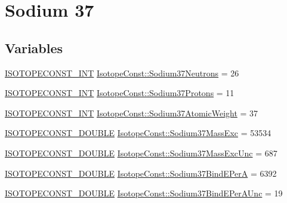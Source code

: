 \hypertarget{group___isotope_const-_sodium-_na37}{}\section{Sodium 37}
\label{group___isotope_const-_sodium-_na37}
\subsection*{Variables}
\begin{DoxyCompactItemize}
\item 
\mbox{\hyperlink{group___isotope_const-_macros_ga5f18360b3e99483a35c32d789e62621c}{I\+S\+O\+T\+O\+P\+E\+C\+O\+N\+S\+T\+\_\+\+I\+NT}} \mbox{\hyperlink{group___isotope_const-_sodium-_na37_ga4e99f0a91daca3e8f0f4841bedc4acd6}{Isotope\+Const\+::\+Sodium37\+Neutrons}} = 26
\item 
\mbox{\hyperlink{group___isotope_const-_macros_ga5f18360b3e99483a35c32d789e62621c}{I\+S\+O\+T\+O\+P\+E\+C\+O\+N\+S\+T\+\_\+\+I\+NT}} \mbox{\hyperlink{group___isotope_const-_sodium-_na37_ga2a98a7717f7478527d21cc03a9606cd2}{Isotope\+Const\+::\+Sodium37\+Protons}} = 11
\item 
\mbox{\hyperlink{group___isotope_const-_macros_ga5f18360b3e99483a35c32d789e62621c}{I\+S\+O\+T\+O\+P\+E\+C\+O\+N\+S\+T\+\_\+\+I\+NT}} \mbox{\hyperlink{group___isotope_const-_sodium-_na37_ga9a2eb9be0772b138d87dd13cd55b600a}{Isotope\+Const\+::\+Sodium37\+Atomic\+Weight}} = 37
\item 
\mbox{\hyperlink{group___isotope_const-_macros_ga8f45a7272ce02c0b4c65c44636ed719a}{I\+S\+O\+T\+O\+P\+E\+C\+O\+N\+S\+T\+\_\+\+D\+O\+U\+B\+LE}} \mbox{\hyperlink{group___isotope_const-_sodium-_na37_gaceaaf7e2fc609d8f1e7f5c461ec3d171}{Isotope\+Const\+::\+Sodium37\+Mass\+Exc}} = 53534
\item 
\mbox{\hyperlink{group___isotope_const-_macros_ga8f45a7272ce02c0b4c65c44636ed719a}{I\+S\+O\+T\+O\+P\+E\+C\+O\+N\+S\+T\+\_\+\+D\+O\+U\+B\+LE}} \mbox{\hyperlink{group___isotope_const-_sodium-_na37_gabfd537517d3cb0e76c3d161295430f16}{Isotope\+Const\+::\+Sodium37\+Mass\+Exc\+Unc}} = 687
\item 
\mbox{\hyperlink{group___isotope_const-_macros_ga8f45a7272ce02c0b4c65c44636ed719a}{I\+S\+O\+T\+O\+P\+E\+C\+O\+N\+S\+T\+\_\+\+D\+O\+U\+B\+LE}} \mbox{\hyperlink{group___isotope_const-_sodium-_na37_ga4d66597392b2b7eae6f25c0c4e667016}{Isotope\+Const\+::\+Sodium37\+Bind\+E\+PerA}} = 6392
\item 
\mbox{\hyperlink{group___isotope_const-_macros_ga8f45a7272ce02c0b4c65c44636ed719a}{I\+S\+O\+T\+O\+P\+E\+C\+O\+N\+S\+T\+\_\+\+D\+O\+U\+B\+LE}} \mbox{\hyperlink{group___isotope_const-_sodium-_na37_gabb1ebed52eb8917630d2933db0fba69e}{Isotope\+Const\+::\+Sodium37\+Bind\+E\+Per\+A\+Unc}} = 19

\end{DoxyCompactItemize}
